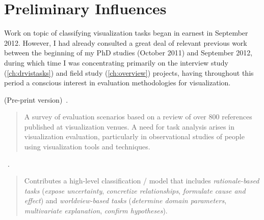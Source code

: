
\section{Preliminary Influences}
\label{app:typology:chronology:preliminary}


Work on topic of classifying visualization tasks began in earnest in September 2012.
However, I had already consulted a great deal of relevant previous work between the beginning of my PhD studies (October 2011) and September 2012, during which time I was concentrating primarily on the interview study (\autoref{ch:drvistasks}) and field study (\autoref{ch:overview}) projects, having throughout this period a conscious interest in evaluation methodologies for visualization.

\begin{sloppypar}
 (Pre-print version)~\cite{Lam2012}. \end{sloppypar}

\begin{quotation}
    A survey of evaluation scenarios based on a review of over 800 references published at visualization venues.
    A need for task analysis arises in visualization evaluation, particularly in observational studies of people using visualization tools and techniques.
\end{quotation}

\begin{sloppypar}
~\cite{Amar2004}. \end{sloppypar}

\begin{quotation}
    \begin{sloppypar}
    Contributes a high-level classification / model that includes {\it rationale-based tasks} ({\it expose uncertainty}, {\it concretize relationships}, {\it formulate cause and effect}) and {\it worldview-based tasks} ({\it determine domain parameters}, {\it multivariate explanation}, {\it confirm hypotheses}).
    \end{sloppypar}
\end{quotation}

